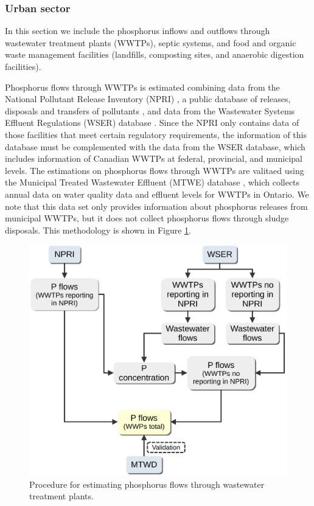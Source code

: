\documentclass[authoryear]{elsarticle}
\begin{document}

\subsubsection{Urban sector}
In this section we include the phosphorus inflows and outflows through wastewater treatment plants (WWTPs), septic systems, and food and organic waste management facilities (landfills, composting sites, and anaerobic digestion facilities).


Phosphorus flows through WWTPs is estimated combining data from the National Pollutant Release Inventory (NPRI) \citep{NPRI}, a public database of releases, disposals and transfers of pollutants
, and data from the Wastewater Systems Effluent Regulations (WSER) database \citep{WSER}. Since the NPRI only contains data of those facilities that meet certain regulatory requirements, the information of this database must be complemented with the data from the WSER database, which includes information of Canadian WWTPs at federal, provincial, and municipal levels. The estimations on phosphorus flows through WWTPs are valitaed using the Municipal Treated Wastewater Effluent (MTWE) database \citep{MTWE}, which collects annual data on water quality data and effluent levels for WWTPs in Ontario.
We note that this data set only provides information about phosphorus releases from municipal WWTPs, but it does not collect phosphorus flows through sludge disposals.
This methodology is shown in Figure \ref{fig:MethodWWTPs}.


\begin{figure}[H]
	\centering
	\includegraphics[width=0.6\linewidth, trim={0cm 0cm 0cm 0cm},clip]{Figures/FigJorge.pdf} 
	\caption{Procedure for estimating phosphorus flows through wastewater treatment plants.}
	\label{fig:MethodWWTPs}
\end{figure}
\end{document}
